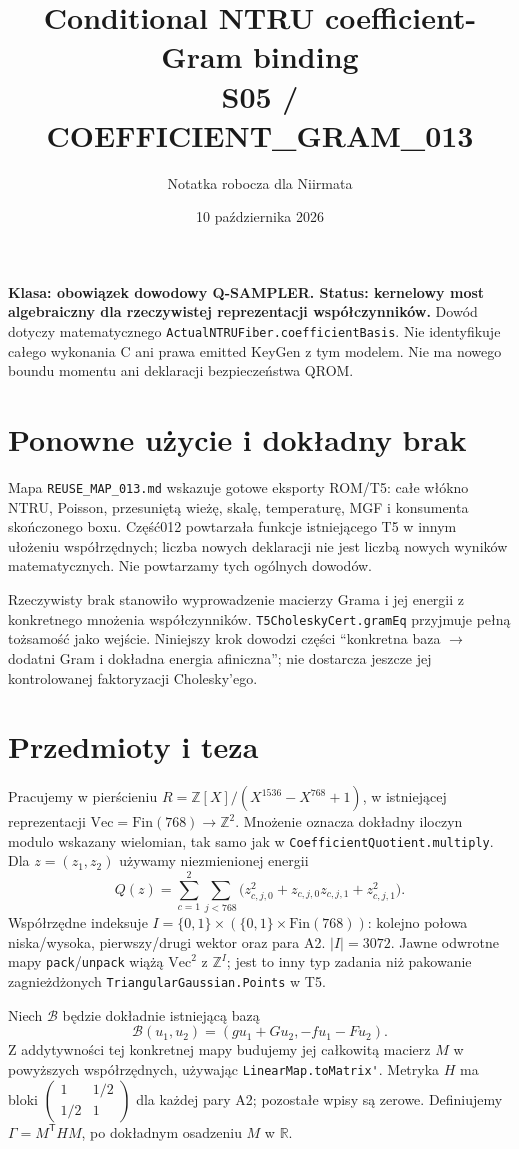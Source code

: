 \documentclass[11pt,a4paper]{article}
\title{Conditional NTRU coefficient-Gram binding\\\large S05 / COEFFICIENT\_GRAM\_013}
\author{Notatka robocza dla Niirmata}\date{10 października 2026}
\newcommand{\code}[1]{\nolinkurl{#1}}
\begin{document}
\maketitle
\textbf{Klasa: obowiązek dowodowy Q-SAMPLER. Status: kernelowy most
algebraiczny dla rzeczywistej reprezentacji współczynników.}
Dowód dotyczy matematycznego \code{ActualNTRUFiber.coefficientBasis}.
Nie identyfikuje całego wykonania C ani prawa emitted KeyGen z tym modelem.
Nie ma nowego boundu momentu ani deklaracji bezpieczeństwa QROM.

\section{Ponowne użycie i dokładny brak}
Mapa \code{REUSE_MAP_013.md} wskazuje gotowe eksporty ROM/T5: całe włókno
NTRU, Poisson, przesuniętą wieżę, skalę, temperaturę, MGF i konsumenta
skończonego boxu. Część012 powtarzała funkcje istniejącego T5 w innym
ułożeniu współrzędnych; liczba nowych deklaracji nie jest liczbą nowych
wyników matematycznych. Nie powtarzamy tych ogólnych dowodów.

Rzeczywisty brak stanowiło wyprowadzenie macierzy Grama i jej energii
z konkretnego mnożenia współczynników. \code{T5CholeskyCert.gramEq}
przyjmuje pełną tożsamość jako wejście. Niniejszy krok dowodzi części
``konkretna baza $\to$ dodatni Gram i dokładna energia afiniczna'';
nie dostarcza jeszcze jej kontrolowanej faktoryzacji Cholesky'ego.

\section{Przedmioty i teza}
Pracujemy w pierścieniu
$R=\mathbb Z[X]/(X^{1536}-X^{768}+1)$, w istniejącej reprezentacji
$\mathrm{Vec}=\mathrm{Fin}(768)\to\mathbb Z^2$.
Mnożenie oznacza dokładny iloczyn modulo wskazany wielomian, tak samo
jak w \code{CoefficientQuotient.multiply}. Dla $z=(z_1,z_2)$ używamy
niezmienionej energii
\[
 Q(z)=\sum_{c=1}^2\sum_{j<768}
 \bigl(z_{c,j,0}^2+z_{c,j,0}z_{c,j,1}+z_{c,j,1}^2\bigr).
\]
Współrzędne indeksuje $I=\{0,1\}\times(\{0,1\}\times\mathrm{Fin}(768))$:
kolejno połowa niska/wysoka, pierwszy/drugi wektor oraz para A2.
$|I|=3072$. Jawne odwrotne mapy \code{pack}/\code{unpack} wiążą
$\mathrm{Vec}^2$ z $\mathbb Z^I$; jest to inny typ zadania niż pakowanie
zagnieżdżonych \code{TriangularGaussian.Points} w T5.

Niech $\mathcal B$ będzie dokładnie istniejącą bazą
\[
 \mathcal B(u_1,u_2)=(gu_1+Gu_2,-fu_1-Fu_2).
\]
Z addytywności tej konkretnej mapy budujemy jej całkowitą macierz $M$
w powyższych współrzędnych, używając \code{LinearMap.toMatrix'}.
Metryka $H$ ma bloki $\left(\begin{smallmatrix}1&1/2\\1/2&1\end{smallmatrix}\right)$
dla każdej pary A2; pozostałe wpisy są zerowe. Definiujemy
$\Gamma=M^{\mathsf T}HM$, po dokładnym osadzeniu $M$ w $\mathbb R$.
\end{document}
